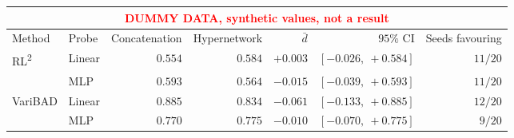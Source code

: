 \setlength{\tabcolsep}{4pt}
\begin{tabular}{llrrrrr}
\toprule
\multicolumn{7}{c}{\textcolor{red}{\footnotesize DUMMY DATA, synthetic values, not a result}} \\
\hline
Method & Probe & Concatenation & Hypernetwork & $\bar{d}$ & $95\%$ CI & Seeds favouring \\
\midrule
RL\textsuperscript{2} & Linear & $0.554$ & $0.584$ & $+0.003$ & $[-0.026,\ +0.584]$ & $11/20$ \\
 & MLP & $0.593$ & $0.564$ & $-0.015$ & $[-0.039,\ +0.593]$ & $11/20$ \\
\cmidrule(l){2-7}
VariBAD & Linear & $0.885$ & $0.834$ & $-0.061$ & $[-0.133,\ +0.885]$ & $12/20$ \\
 & MLP & $0.770$ & $0.775$ & $-0.010$ & $[-0.070,\ +0.775]$ & $9/20$ \\
\bottomrule
\end{tabular}
